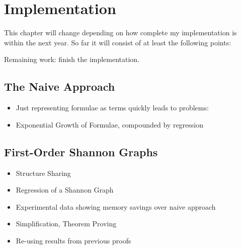 \chapter{Implementation}\label{ch:implementation}

This chapter will change depending on how complete my implementation is within the next year.  So far it will consist of at least the following points:

Remaining work: finish the implementation.

\section{The Naive Approach}

\begin{itemize}
\item Just representing formulae as terms quickly leads to problems:
\item Exponential Growth of Formulae, compounded by regression
\end{itemize}

\section{First-Order Shannon Graphs}

\begin{itemize}
\item Structure Sharing
\item Regression of a Shannon Graph
\item Experimental data showing memory savings over naive approach
\item Simplification, Theorem Proving
\item Re-using results from previous proofs
\end{itemize}

